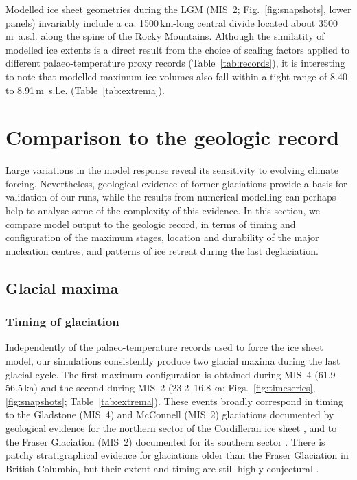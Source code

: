 \documentclass[tc]{copernicus}
\begin{document}
Modelled ice sheet geometries during the LGM (MIS~2; Fig.~\ref{fig:snapshots},
lower panels) invariably include a ca. 1500\,km-long central divide located
about 3500\,m~a.s.l. along the spine of the Rocky Mountains. Although the
similatity of modelled ice extents is a direct result from the choice of scaling
factors applied to different palaeo-temperature proxy records
(Table~\ref{tab:records}), it is interesting to note that modelled maximum ice
volumes also fall within a tight range of 8.40 to 8.91\,m~s.l.e.
(Table~\ref{tab:extrema}).


\section{Comparison to the geologic record}
\label{sec:discussion}

Large variations in the model response reveal its sensitivity to evolving
climate forcing. Nevertheless, geological evidence of former glaciations
provide a basis for validation of our runs, while the results from numerical
modelling can perhaps help to analyse some of the complexity of this evidence.
In this section, we compare model output to the geologic record, in terms of
timing and configuration of the maximum stages, location and durability of the
major nucleation centres, and patterns of ice retreat during the last
deglaciation.

\subsection{Glacial maxima}

\subsubsection{Timing of glaciation}
\label{sec:timing}

Independently of the palaeo-temperature records
used to force the ice sheet model, our simulations consistently produce two
glacial maxima during the last glacial cycle. The first maximum configuration
is obtained during MIS~4 (61.9--56.5\,ka) and the second during MIS~2
(23.2--16.8\,ka; Figs.~\ref{fig:timeseries}, \ref{fig:snapshots};
Table~\ref{tab:extrema}). These events broadly correspond in timing to the
Gladstone
(MIS~4) and McConnell (MIS~2) glaciations documented by geological evidence for
the northern sector of the Cordilleran ice sheet
    \citep{Duk-Rodkin.etal.1996, Ward.etal.2007,
           Stroeven.etal.2010, Stroeven.etal.2014},
and to the Fraser Glaciation (MIS~2) documented for its southern sector
    \citep{Porter.Swanson.1998, Margold.etal.2014}.
There is patchy stratigraphical evidence for glaciations older than the Fraser
Glaciation \citep{Clague.Ward.2011} in British Columbia, but their extent and
timing are still highly conjectural
    \citep[perhaps MIS~4 or early MIS~3; e.g.,][]{Cosma.etal.2008}.
\end{document}
